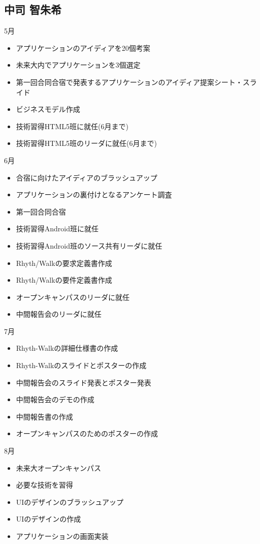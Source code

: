 \subsection{中司 智朱希}

5月
\begin{itemize}
\item アプリケーションのアイディアを20個考案
\item 未来大内でアプリケーションを3個選定
\item 第一回合同合宿で発表するアプリケーションのアイディア提案シート・スライド
\item ビジネスモデル作成
\item 技術習得HTML5班に就任(6月まで)
\item 技術習得HTML5班のリーダに就任(6月まで)
\end{itemize}
6月
\begin{itemize}
\item 合宿に向けたアイディアのブラッシュアップ
\item アプリケーションの裏付けとなるアンケート調査
\item 第一回合同合宿
\item 技術習得Android班に就任
\item 技術習得Android班のソース共有リーダに就任
\item Rhyth/Walkの要求定義書作成
\item Rhyth/Walkの要件定義書作成
\item オープンキャンパスのリーダに就任
\item 中間報告会のリーダに就任
\end{itemize}
7月
\begin{itemize}
\item Rhyth-Walkの詳細仕様書の作成
\item Rhyth-Walkのスライドとポスターの作成
\item 中間報告会のスライド発表とポスター発表
\item 中間報告会のデモの作成
\item 中間報告書の作成
\item オープンキャンパスのためのポスターの作成
\end{itemize}
8月
\begin{itemize}
\item 未来大オープンキャンパス
\item 必要な技術を習得
\item UIのデザインのブラッシュアップ
\item UIのデザインの作成
\item アプリケーションの画面実装
\end{itemize}
